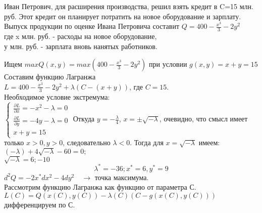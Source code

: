 \documentclass[addpoints, answers]{exam} %
\begin{document}
\begin{questions}
\begin{solution}
\end{solution}


\question	Иван Петрович, для расширения производства, решил взять кредит в C=15 млн. руб. Этот кредит он планирует потратить на новое оборудование и зарплату. Выпуск продукции  по оценке Ивана Петровича составит $Q=400-\frac{x^3}{3}-2y^2$\\
где x млн. руб. - расходы на новое оборудование, \\
 у млн. руб. - зарплата вновь нанятых работников. \\

\begin{solution}
Ищем $max Q(x,y)=max(400-\frac{x^3}{3}-2y^2)$ при условии $g(x,y)=x+y=15$\\
Составим функцию Лагранжа\\
$L=400-\frac{x^3}{3}-2y^2+\lambda(C-(x+y))$, где $C=15$.\\
Необходимое условие экстремума:\\
$
\begin{cases}
\frac{\partial L}{\partial x}=-x^2-\lambda=0\\
\frac{\partial L}{\partial y}=-4y-\lambda=0\\
x+y=15
\end{cases}
$
Откуда $y=-\frac{\lambda}{4}$, $x=\pm \sqrt{-\lambda}$, очевидно, что смысл имеет только $x>0,y>0$, следовательно $\lambda<0$.
Тогда для $x=\sqrt{-\lambda}$  имеем:\\
$(-\lambda)+4\sqrt{-\lambda}-60=0;$\\
$\sqrt{-\lambda}=6;-10$\\
\[\lambda^*=-36; x^*=6, y^*=9\]
$d^2Q=-2x^*dx^2-4dy^2 \quad \rightarrow$ точка максимума.\\

Рассмотрим функцию Лагранжа как функцию от параметра С.\\
$L(C)=Q(x(C), y(C))-\lambda(C)(C-g(x(C),y(C)))$ дифференцируем по С.\\


\end{solution}
\end{questions}
\end{document}
